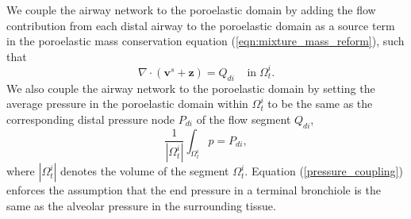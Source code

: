 %
 We couple the airway network to the poroelastic domain by adding the flow contribution from each distal airway to the poroelastic domain as a source term in the poroelastic mass conservation equation (\ref{eqn:mixture_mass_reform}), such that
\begin{equation}
 \nabla \cdot ( \boldsymbol{v}^{s} + \boldsymbol{z}) = Q_{di} \;\;\;\; \mbox{in}\;\Omega_{t}^{i}.
 \label{fluid_mass_coupling}
\end{equation}
We also couple the airway network to the poroelastic domain by setting the average pressure in the poroelastic domain within $\Omega_{t}^{i}$ to be the same as the corresponding distal pressure node $P_{di}$ of the flow segment $Q_{di}$,
  \begin{equation}
  \frac{1}{|\Omega_{t}^{i}|} \int_{\Omega_{t}^{i}} p = P_{di},
   \label{pressure_coupling}
 \end{equation}
where $|\Omega_{t}^{i}|$ denotes the volume of the segment $\Omega_{t}^{i}$. Equation (\ref{pressure_coupling}) enforces the assumption that the end pressure in a terminal bronchiole is the same as the alveolar pressure in the surrounding tissue. %
%
%
